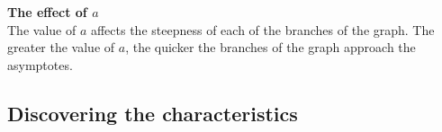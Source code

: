 \textbf{The effect of $a$}
\\
The value of $a$ affects the steepness of each of the branches of the graph. The greater the value of $a$, the quicker the branches of the graph approach the asymptotes.


\subsection*{Discovering the characteristics}
